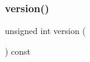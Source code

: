 \mbox{\label{classMap_a0aa696ccb72cbf928535d6b646bac1aa}} 
\subsubsection{\texorpdfstring{version()}{version()}}
{\footnotesize\ttfamily unsigned int version (\begin{DoxyParamCaption}{ }\end{DoxyParamCaption}) const}


